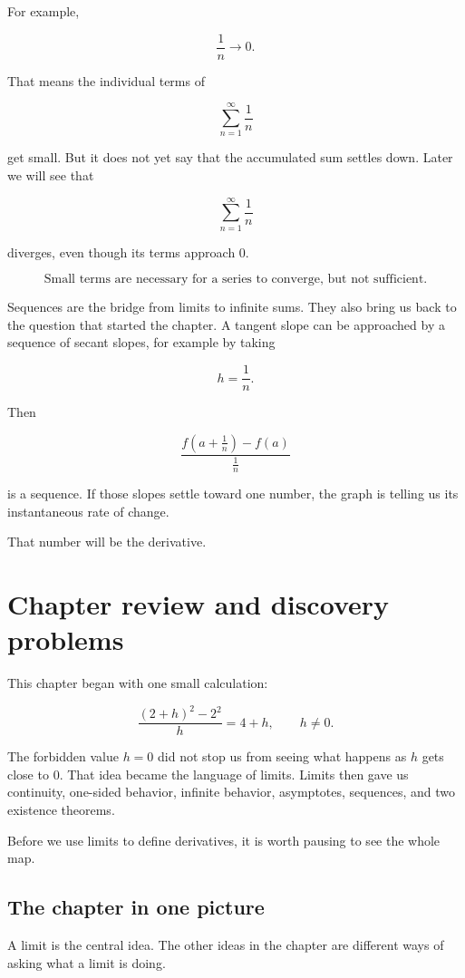 For example,

\[
\frac1n\to0.
\]

That means the individual terms of

\[
\sum_{n=1}^{\infty}\frac1n
\]

get small.  But it does not yet say that the accumulated sum settles down.  Later we will see that

\[
\sum_{n=1}^{\infty}\frac1n
\]

diverges, even though its terms approach \(0\).

\[
\boxed{
\text{Small terms are necessary for a series to converge, but not sufficient.}
}
\]

Sequences are the bridge from limits to infinite sums.  They also bring us back to the question that started the chapter.  A tangent slope can be approached by a sequence of secant slopes, for example by taking

\[
h=\frac1n.
\]

Then

\[
\frac{f(a+\frac1n)-f(a)}{\frac1n}
\]

is a sequence.  If those slopes settle toward one number, the graph is telling us its instantaneous rate of change.

That number will be the derivative.
\section{Chapter review and discovery problems}
\label{sec:chapter3-review-discovery}

This chapter began with one small calculation:

\[
\frac{(2+h)^2-2^2}{h}=4+h,
\qquad h\neq0.
\]

The forbidden value \(h=0\) did not stop us from seeing what happens as \(h\) gets close to \(0\).  That idea became the language of limits.  Limits then gave us continuity, one-sided behavior, infinite behavior, asymptotes, sequences, and two existence theorems.

Before we use limits to define derivatives, it is worth pausing to see the whole map.

\subsection{The chapter in one picture}
\label{subsec:chapter3-one-picture}

A limit is the central idea.  The other ideas in the chapter are different ways of asking what a limit is doing.

